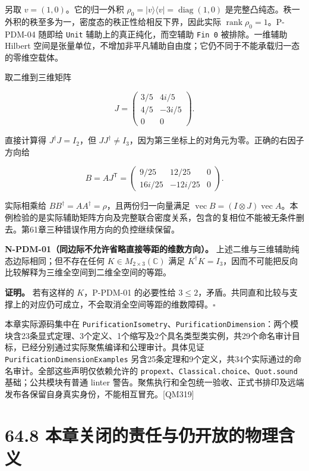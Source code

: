 \documentclass[
  11pt,
  oneside]{book}
\begin{document}
另取 \(v=(1,0)\)。它的归一外积
\(\rho_0=|v\rangle\langle v|=\operatorname{diag}(1,0)\)
是完整凸纯态。秩一外积的秩至多为一，密度态的秩正性给相反下界，因此实际
\(\operatorname{rank}\rho_0=1\)。P-PDM-04 随即给 \texttt{Unit}
辅助上的真正纯化，而空辅助 \texttt{Fin\ 0} 被排除。一维辅助 Hilbert
空间是张量单位，不增加非平凡辅助自由度；它仍不同于不能承载归一态的零维空载体。

取二维到三维矩阵

\[
J=\begin{pmatrix}
3/5&4i/5\\
4/5&-3i/5\\
0&0
\end{pmatrix}.
\]

直接计算得 \(J^\dagger J=I_2\)，但
\(JJ^\dagger\ne I_3\)，因为第三坐标上的对角元为零。正确的右因子方向给

\[
B=AJ^{\mathsf T}
=\begin{pmatrix}
9/25&12/25&0\\
16i/25&-12i/25&0
\end{pmatrix}.
\]

实际相乘给 \(BB^\dagger=AA^\dagger=\rho\)，且两份归一向量满足
\(\operatorname{vec}B=(I\otimes J)\operatorname{vec}A\)。本例检验的是实际辅助矩阵方向及完整联合密度关系，包含的复相位不能被无条件删去。第61章三种错误作用方向的负控继续保留。

\protect\hypertarget{n-pdm-01}{}{}

\textbf{N-PDM-01（同边际不允许省略直接等距的维数方向）。}
上述二维与三维辅助纯态边际相同；但不存在任何
\(K\in M_{2\times3}(\mathbb C)\) 满足
\(K^\dagger K=I_3\)，因而不可能把反向比较解释为三维全空间到二维全空间的等距。

\textbf{证明。} 若有这样的 \(K\)，P-PDM-01 的必要性给
\(3\le2\)，矛盾。共同直和比较与支撑上的对应仍可成立，不会取消全空间等距的维数障碍。\(\square\)

本章实际源码集中在
\texttt{Purification\allowbreak Isometry}、\allowbreak \texttt{Purification\allowbreak Dimension}：两个模块含23条显式定理、3个定义、1个缩写及2个具名类型类实例，共29个命名审计目标，已经分别通过实际聚焦编译和公理审计。具体见证
\texttt{Purification\allowbreak Dimension\allowbreak Examples}
另含25条定理和9个定义，共34个实际通过的命名审计。全部这些声明仅依赖允许的
\texttt{propext}、\allowbreak \texttt{Classical.\allowbreak choice}、\allowbreak \texttt{Quot.\allowbreak sound}
基础；公共模块有普通 linter
警告。聚焦执行和全包统一验收、正式书排印及远端发布各保留自身真实身份，不能相互冒充。{[}QM319{]}

\section{64.8 本章关闭的责任与仍开放的物理含义}
\end{document}
